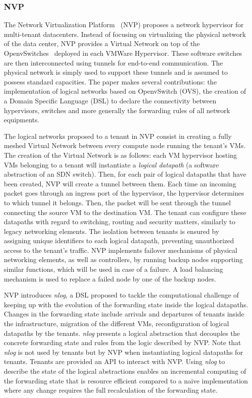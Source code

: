 \subsubsection{NVP}
The Network Virtualization Platform~\cite{NVP-Koponen2014} (NVP) proposes a network hypervisor for multi-tenant datacenters. Instead of focusing on virtualizing the physical network of the data center, NVP provides a Virtual Network on top of the OpenvSwitches~\cite{openvswitch} deployed in each VMWare Hypervisor. These software switches are then interconnected using tunnels for end-to-end communication. 
The physical network is simply used to support these tunnels and is assumed to possess standard capacities.
The paper makes several contributions: the implementation of logical networks based on OpenvSwitch (OVS), the creation of a Domain Specific Language (DSL) to declare the connectivity between hypervisors, switches and more generally the forwarding rules of all network equipments.

The logical networks proposed to a tenant in NVP consist in creating a fully meshed Virtual Network between every compute node running the tenant's VMs.
The creation of the Virtual Network is as follows:
each VM hypervisor hosting VMs belonging to a tenant will instantiate a \textit{logical datapath} (\ie a software abstraction of an SDN switch). 
Then, for each pair of logical datapaths that have been created, NVP will create a tunnel between them.
Each time an incoming packet goes through an ingress port of the hypervisor, the hypervisor determines to which tunnel it belongs. Then, the packet will be sent through the tunnel connecting the source VM to the destination VM.
The tenant can configure these datapaths with regard to switching, routing and security matters, similarly to legacy networking elements.
The isolation between tenants is ensured by assigning unique identifiers to each logical datapath, preventing unauthorized access to the tenant's traffic.
NVP implements failover mechanisms of physical networking elements, as well as controllers, by running backup nodes supporting similar functions, which will be used in case of a failure.
A load balancing mechanism is used to replace a failed node by one of the backup nodes.

NVP introduces \textit{nlog}, a DSL proposed to tackle the computational challenge of keeping up with the evolution of the forwarding state inside the logical datapaths. Changes in the forwarding state include arrivals and departures of tenants inside the infrastructure, migration of the different VMs, reconfiguration of logical datapaths by the tenants. \textit{nlog} presents a logical abstraction that decouples the concrete forwarding state and rules from the logic described by NVP. Note that \textit{nlog} is not used by tenants but by NVP when instantiating logical datapaths for tenants.
Tenants are provided an API to interact with NVP.
Using \textit{nlog} to describe the state of the logical abstractions enables an incremental computing of the forwarding state that is resource efficient compared to a naive implementation where any change requires the full recalculation of the forwarding state.

